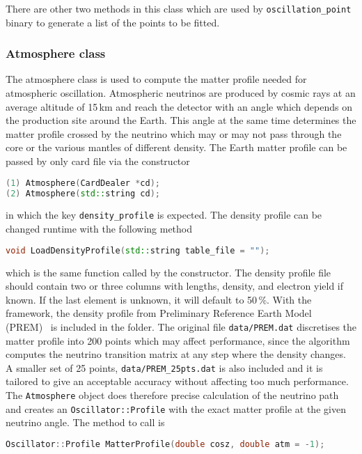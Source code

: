 \documentclass[a4paper, 11pt]{article}
\begin{document}
There are other two methods in this class which are used by \texttt{oscillation\_point} binary %
to generate a list of the points to be fitted.

\subsubsection{Atmosphere class}
\label{sec:atmosphere}

The atmosphere class is used to compute the matter profile needed for atmospheric oscillation.
Atmospheric neutrinos are produced by cosmic rays at an average altitude of 15\,km and reach the detector with an angle which depends %
on the production site around the Earth.
This angle at the same time determines the matter profile crossed by the neutrino which may or may not pass through the core or the various mantles %
of different density.
The Earth matter profile can be passed by only card file via the constructor
\begin{lstlisting}[language=C++]
(1) Atmosphere(CardDealer *cd);
(2) Atmosphere(std::string cd);
\end{lstlisting}
in which the key \texttt{density\_profile} is expected.
The density profile can be changed runtime with the following method 
\begin{lstlisting}[language=C++]
    void LoadDensityProfile(std::string table_file = "");
\end{lstlisting}
which is the same function called by the constructor.
The density profile file should contain two or three columns with lengths, density, and electron yield if known.
If the last element is unknown, it will default to 50\,\%.
With the framework, the density profile from Preliminary Reference Earth Model (PREM)~\cite{Dziewonski:1981xy} is included in the  folder.
The original file \texttt{data/PREM.dat} discretises the matter profile into 200 points which may affect performance, %
since the algorithm computes the neutrino transition matrix at any step where the density changes.
A smaller set of 25 points, \texttt{data/PREM\_25pts.dat} is also included and it is tailored to give an acceptable accuracy without affecting too much performance.
The \texttt{Atmosphere} object does therefore precise calculation of the neutrino path and creates an \texttt{Oscillator::Profile} %
with the exact matter profile at the given neutrino angle.
The method to call is
\begin{lstlisting}[language=C++]
    Oscillator::Profile MatterProfile(double cosz, double atm = -1);
\end{lstlisting}
\end{document}
